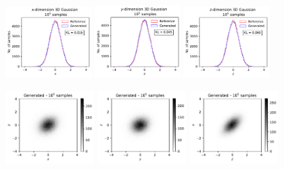 \documentclass[twocolumn,preprintnumbers,superscriptaddress]{revtex4-2}
\begin{document}
\begin{figure}

 
  \includegraphics[width=0.29\textwidth]{plots/3Dgaussian_posdef/1-distribution_3dgaussian_100k.pdf}%
  \includegraphics[width=0.29\textwidth]{plots/3Dgaussian_posdef/2-distribution_3dgaussian_100k.pdf}%
  \includegraphics[width=0.29\textwidth]{plots/3Dgaussian_posdef/3-distribution_3dgaussian_100k.pdf}
  
  \includegraphics[width=0.3\textwidth]{plots/3Dgaussian_posdef/1-2_FAKE_100k.pdf}%
  \includegraphics[width=0.3\textwidth]{plots/3Dgaussian_posdef/2-3_FAKE_100k.pdf}%
  \includegraphics[width=0.3\textwidth]{plots/3Dgaussian_posdef/3-1_FAKE_100k.pdf}
  

\end{figure}
\end{document}
